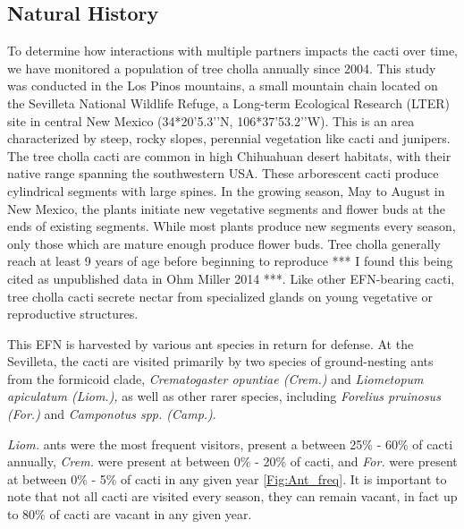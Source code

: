 \documentclass[12pt,a4paper]{article}
\begin{document}
\subsection*{Natural History}
To determine how interactions with multiple partners impacts the cacti over time, we have monitored a population of tree cholla annually since 2004. 
This study was conducted in the Los Pinos mountains, a small mountain chain located on the Sevilleta National Wildlife Refuge, a Long-term Ecological Research (LTER) site in central New Mexico (34*20’5.3’’N, 106*37’53.2’’W).
This is an area characterized by steep, rocky slopes, perennial vegetation like cacti and junipers. 
The tree cholla cacti are common in high Chihuahuan desert habitats, with their native range spanning the southwestern USA\cite{Benson1982}. 
These arborescent cacti produce cylindrical segments with large spines. 
In the growing season, May to August in New Mexico, the plants initiate new vegetative segments and flower buds at the ends of existing segments. 
While most plants produce new segments every season, only those which are mature enough produce flower buds. 
Tree cholla generally reach at least 9 years of age before beginning to reproduce *** I found this being cited as unpublished data in Ohm Miller 2014 ***. 
Like other EFN-bearing cacti, tree cholla cacti secrete nectar from specialized glands on young vegetative or reproductive structures\cite{Ness2006,Oliveira1999}.

This EFN is harvested by various ant species in return for defense. 
At the Sevilleta, the cacti are visited primarily by two species of ground-nesting ants from the formicoid clade, \textit{Crematogaster opuntiae (Crem.) } and \textit{Liometopum apiculatum (Liom.), } as well as other rarer species, including \textit{Forelius pruinosus (For.) } and \textit{Camponotus spp. (Camp.)}.

\textit{Liom.} ants were the most frequent visitors, present a  between 25\% - 60\% of cacti annually, \textit{Crem.} were present at between 0\% - 20\% of cacti, and \textit{For.} were present at between 0\% - 5\% of cacti in any given year \ref{Fig:Ant_freq}. 
It is important to note that not all cacti are visited every season, they can remain vacant, in fact up to 80\% of cacti are vacant in any given year. 
\end{document}

